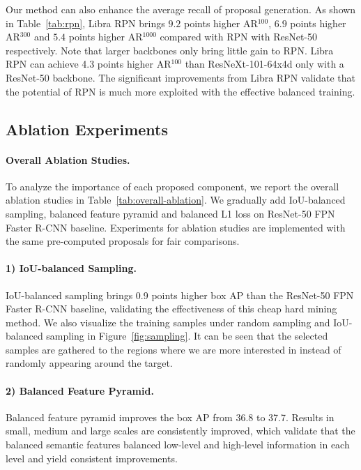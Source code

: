 \documentclass[10pt,twocolumn,letterpaper]{article}
\begin{document}
Our method can also enhance the average recall of proposal generation.
As shown in Table~\ref{tab:rpn}, Libra RPN brings $9.2$ points higher AR$^{100}$, $6.9$ points higher AR$^{300}$ and $5.4$ points higher AR$^{1000}$ compared with RPN with ResNet-50 respectively.
Note that larger backbones only bring little gain to RPN.
Libra RPN can achieve 4.3 points higher AR$^{100}$ than ResNeXt-101-64x4d only with a ResNet-50 backbone.
The significant improvements from Libra RPN validate that the potential of RPN is much more exploited with the effective balanced training.

\subsection{Ablation Experiments}
\paragraph{Overall Ablation Studies.}
To analyze the importance of each proposed component, we report the overall ablation studies in Table~\ref{tab:overall-ablation}.
We gradually add IoU-balanced sampling, balanced feature pyramid and balanced L1 loss on ResNet-50 FPN Faster R-CNN baseline.
Experiments for ablation studies are implemented with the same pre-computed proposals for fair comparisons.

\vspace{-12pt}
\paragraph{1) IoU-balanced Sampling.}
IoU-balanced sampling brings 0.9 points higher box AP than the ResNet-50 FPN Faster R-CNN baseline, validating the effectiveness of this cheap hard mining method.
We also visualize the training samples under random sampling and IoU-balanced sampling in Figure~\ref{fig:sampling}.
It can be seen that the selected samples are gathered to the regions where we are more interested in instead of randomly appearing around the target.

\vspace{-12pt}
\paragraph{2) Balanced Feature Pyramid.}
Balanced feature pyramid improves the box AP from 36.8 to 37.7.
Results in small, medium and large scales are consistently improved, which validate that the balanced semantic features balanced low-level and high-level information in each level and yield consistent improvements.
\end{document}
